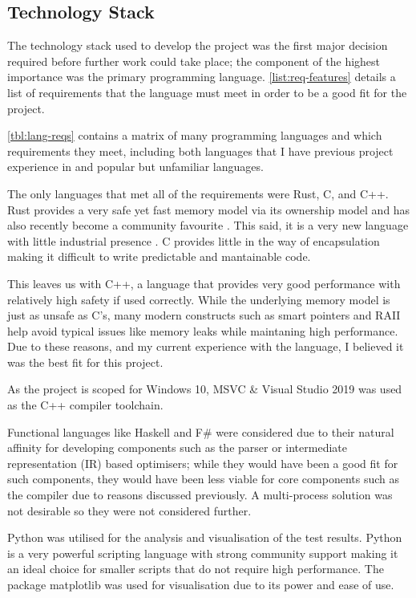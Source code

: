 \subsection{Technology Stack}

The technology stack used to develop the project was the first major decision required before further work could take place; the component of the highest importance was the primary programming language. \autoref{list:req-features} details a list of requirements that the language must meet in order to be a good fit for the project.

\autoref{tbl:lang-reqs} contains a matrix of many programming languages and which requirements they meet, including both languages that I have previous project experience in and popular \cite{stackoverflow-survey} but unfamiliar languages.

The only languages that met all of the requirements were Rust, C, and C++. Rust provides a very safe yet fast memory model via its ownership model \cite{rust-ownership} and has also recently become a community favourite \cite{stackoverflow-survey}. This said, it is a very new language with little industrial presence \cite{stackoverflow-survey}.  C provides little in the way of encapsulation making it difficult to write predictable and mantainable code.

This leaves us with C++, a language that provides very good performance with relatively high safety if used correctly. While the underlying memory model is just as unsafe as C's, many modern constructs such as smart pointers \cite{cpp-smart-ptrs} and RAII \cite{cpp-raii} help avoid typical issues like memory leaks while maintaning high performance. Due to these reasons, and my current experience with the language, I believed it was the best fit for this project.

As the project is scoped for Windows 10, MSVC \& Visual Studio 2019 was used as the C++ compiler toolchain.

Functional languages like Haskell and F\# were considered due to their natural affinity for developing components such as the parser or intermediate representation (IR) based optimisers; while they would have been a good fit for such components, they would have been less viable for core components such as the compiler due to reasons discussed previously. A multi-process solution was not desirable so they were not considered further.

Python was utilised for the analysis and visualisation of the test results. Python is a very powerful scripting language with strong community support making it an ideal choice for smaller scripts that do not require high performance. The package matplotlib was used for visualisation due to its power and ease of use.

